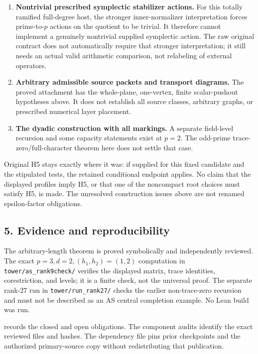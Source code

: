 \begin{enumerate}
\def\labelenumi{\arabic{enumi}.}
\tightlist
\item
  \textbf{Nontrivial prescribed symplectic stabilizer actions.} For this
  totally ramified full-degree host, the stronger inner-normalizer
  interpretation forces prime-to-\(p\) actions on the quotient to be
  trivial. It therefore cannot implement a genuinely nontrivial supplied
  symplectic action. The raw original contract does not automatically
  require that stronger interpretation; it still needs an actual valid
  arithmetic comparison, not relabeling of external operators.
\item
  \textbf{Arbitrary admissible source packets and transport diagrams.}
  The proved attachment has the whole-plane, one-vertex, finite
  scalar-pushout hypotheses above. It does not establish all source
  classes, arbitrary graphs, or prescribed numerical layer placement.
\item
  \textbf{The dyadic construction with all markings.} A separate
  field-level recursion and some capacity statements exist at \(p=2\).
  The odd-prime trace-zero/full-character theorem here does not settle
  that case.
\end{enumerate}

Original H5 stays exactly where it was: if supplied for this fixed
candidate and the stipulated tests, the retained conditional endpoint
applies. No claim that the displayed profiles imply H5, or that one of
the noncompact root choices must satisfy H5, is made. The unresolved
construction issues above are not renamed epsilon-factor obligations.

\hypertarget{odd_synthesis-evidence-and-reproducibility}{%
\subsection{5. Evidence and
reproducibility}\label{odd_synthesis-evidence-and-reproducibility}}

The arbitrary-length theorem is proved symbolically and independently
reviewed. The exact \(p=3,d=2,(h_1,h_2)=(1,2)\) computation in
\texttt{tower/as\_rank9check/} verifies the displayed matrix, trace
identities, corestriction, and levels; it is a finite check, not the
universal proof. The separate rank-27 run in \texttt{tower/run\_rank27/}
checks the earlier non-trace-zero recursion and must not be described as
an AS central completion example. No Lean build was run.

 records the closed and open obligations. The
component audits identify the exact reviewed files and hashes. The
dependency file pins prior checkpoints and the authorized primary-source
copy without redistributing that publication.
